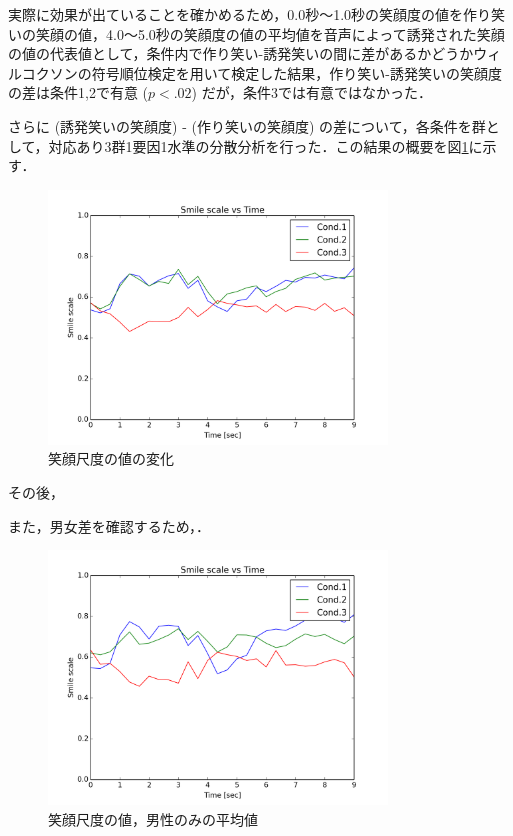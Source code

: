 \documentclass[submit,techreq]{ec2014}
\begin{document}
実際に効果が出ていることを確かめるため，0.0秒〜1.0秒の笑顔度の値を作り笑いの笑顔の値，4.0〜5.0秒の笑顔度の値の平均値を音声によって誘発された笑顔の値の代表値として，条件内で作り笑い-誘発笑いの間に差があるかどうかウィルコクソンの符号順位検定を用いて検定した結果，作り笑い-誘発笑いの笑顔度の差は条件1,2で有意 ($p<.02$) だが，条件3では有意ではなかった．

さらに (誘発笑いの笑顔度) - (作り笑いの笑顔度) の差について，各条件を群として，対応あり3群1要因1水準の分散分析を行った．この結果の概要を図\ref{graph-anova}に示す．

\begin{figure}[h!]
  \centering  
\includegraphics[width=90mm, bb=0 0 600 450]{images/smooth5_avg.png}
\caption{笑顔尺度の値の変化}
  \label{graph-anova}
\end{figure}

その後，

また，男女差を確認するため，．

\begin{figure}[h!]
  \centering  
\includegraphics[width=90mm, bb=0 0 600 450]{images/smooth5_avg_gender_0.png}
\caption{笑顔尺度の値，男性のみの平均値}
  \label{graph-gender}
\end{figure}
\end{document}
